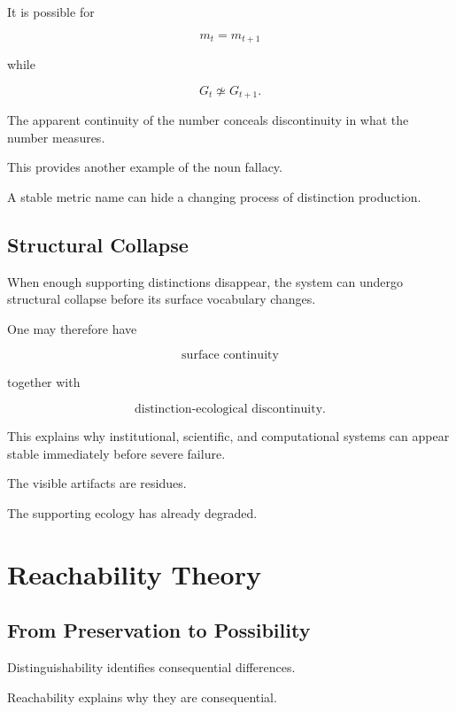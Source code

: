 \documentclass[11pt]{article}
\theoremstyle{remark}
\begin{document}
It is possible for

\begin{equation}
m_t=m_{t+1}
\end{equation}

while

\begin{equation}
G_t\not\simeq G_{t+1}.
\end{equation}

The apparent continuity of the number conceals discontinuity in what the number measures.

This provides another example of the noun fallacy.

A stable metric name can hide a changing process of distinction production.

\subsection{Structural Collapse}

When enough supporting distinctions disappear, the system can undergo structural collapse before its surface vocabulary changes.

One may therefore have

\begin{equation}
\text{surface continuity}
\end{equation}

together with

\begin{equation}
\text{distinction-ecological discontinuity}.
\end{equation}

This explains why institutional, scientific, and computational systems can appear stable immediately before severe failure.

The visible artifacts are residues.

The supporting ecology has already degraded.

\section{Reachability Theory}

\subsection{From Preservation to Possibility}

Distinguishability identifies consequential differences.

Reachability explains why they are consequential.
\end{document}
